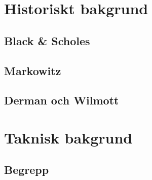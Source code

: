 

\section{Historiskt bakgrund}
\subsection{Black \& Scholes}
\subsection{Markowitz}
\subsection{Derman och Wilmott}
\section{Taknisk bakgrund}
\subsection{Begrepp}